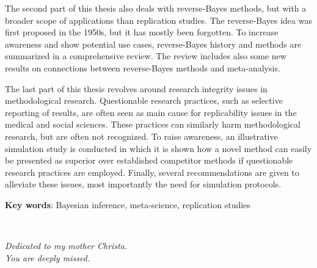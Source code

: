 The second part of this thesis also deals with reverse-Bayes methods, but with a
broader scope of applications than replication studies. The reverse-Bayes idea
was first proposed in the 1950s, but it has mostly been forgotten. To increase
awareness and show potential use cases, reverse-Bayes history and methods are
summarized in a comprehensive review. The review includes also some new results
on connections between reverse-Bayes methods and meta-analysis. %

The last part of this thesis revolves around research integrity issues in
methodological research. Questionable research practices, such as selective
reporting of results, are often seen as main cause for replicability issues in
the medical and social sciences. These practices can similarly harm
methodological research, but are often not recognized. To raise awareness, an
illustrative simulation study is conducted in which it is shown how a novel
method can easily be presented as superior over established competitor methods
if questionable research practices are employed. Finally, several
recommendations are given to alleviate these issues, most importantly the need
for simulation protocols.


\textbf{Key words}: Bayesian inference, meta-science, replication studies


\newpage ~

\newpage



\begin{center}
  \vspace*{5cm}

  \textit{Dedicated to my mother Christa. \\
    You are deeply missed.}
\end{center}
